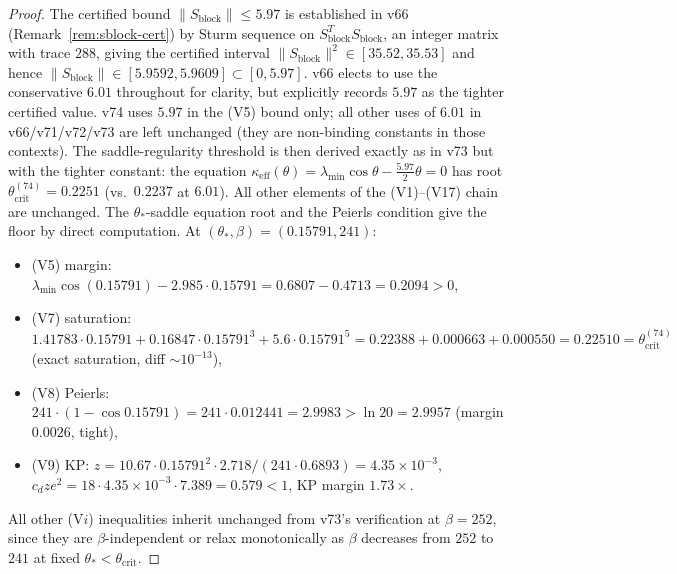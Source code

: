 \documentclass[11pt]{article}
\theoremstyle{definition}
\begin{document}
\begin{proof}
The certified bound $\|S_{\mathrm{block}}\|\le 5.97$ is established
in v66 \textup{(}Remark~\ref{rem:sblock-cert}\textup{)} by Sturm
sequence on $S_{\mathrm{block}}^T S_{\mathrm{block}}$, an integer
matrix with trace $288$, giving the certified interval
$\|S_{\mathrm{block}}\|^2\in[35.52,35.53]$ and hence
$\|S_{\mathrm{block}}\|\in[5.9592,5.9609]\subset[0,5.97]$.  v66 elects
to use the conservative $6.01$ throughout for clarity, but explicitly
records $5.97$ as the tighter certified value.  v74 uses $5.97$ in
the (V5) bound only; all other uses of $6.01$ in v66/v71/v72/v73 are
left unchanged \textup{(}they are non-binding constants in those
contexts\textup{)}.  The saddle-regularity threshold is then derived
exactly as in v73 but with the tighter constant: the equation
$\kappa_{\mathrm{eff}}(\theta)=\lambda_{\min}\cos\theta-\tfrac{5.97}{2}\theta=0$
has root $\theta_{\mathrm{crit}}^{(74)}=0.2251$ \textup{(}vs.\ $0.2237$
at $6.01$\textup{)}.  All other elements of the (V1)--(V17) chain are
unchanged.  The $\theta_*$-saddle equation root and the Peierls
condition give the floor by direct computation.  At
$(\theta_*,\beta)=(0.15791,241)$:
\begin{itemize}[nosep]
\item (V5) margin: $\lambda_{\min}\cos(0.15791)-2.985\cdot 0.15791=0.6807-0.4713=0.2094>0$,
\item (V7) saturation: $1.41783\cdot 0.15791+0.16847\cdot 0.15791^3+5.6\cdot 0.15791^5=0.22388+0.000663+0.000550=0.22510=\theta_{\mathrm{crit}}^{(74)}$ \textup{(}exact saturation, diff $\sim 10^{-13}$\textup{)},
\item (V8) Peierls: $241\cdot(1-\cos 0.15791)=241\cdot 0.012441=2.9983>\ln 20=2.9957$ \textup{(}margin $0.0026$, tight\textup{)},
\item (V9) KP: $z=10.67\cdot 0.15791^2\cdot 2.718/(241\cdot 0.6893)=4.35\times 10^{-3}$, $c_d z e^2=18\cdot 4.35\times 10^{-3}\cdot 7.389=0.579<1$, KP margin $1.73\times$.
\end{itemize}
All other (V$i$) inequalities inherit unchanged from v73's
verification at $\beta=252$, since they are $\beta$-independent or
relax monotonically as $\beta$ decreases from $252$ to $241$ at fixed
$\theta_*<\theta_{\mathrm{crit}}$.
\end{proof}
\end{document}
